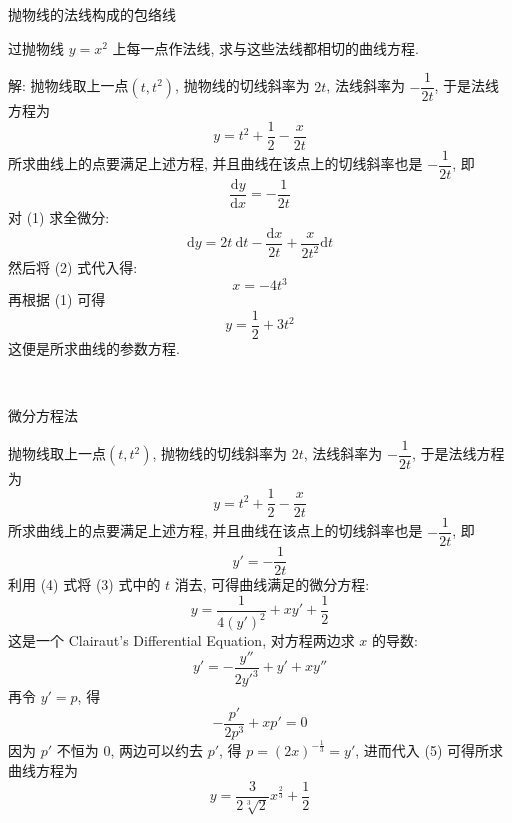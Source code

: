 \newpage

\noindent 抛物线的法线构成的包络线

过抛物线 $y = x^2$ 上每一点作法线, 求与这些法线都相切的曲线方程.
\begin{figure*}[htbp]
\centering
{}
\end{figure*}

解: 抛物线取上一点$(t,t^2)$, 抛物线的切线斜率为 $2t$, 法线斜率为 $-\dfrac{1}{2t}$, 于是法线方程为
\[ y = t^2 + \frac{1}{2} - \frac{x}{2t} \tag{1} \]
所求曲线上的点要满足上述方程, 并且曲线在该点上的切线斜率也是 $-\dfrac{1}{2t}$, 即
\[ \frac{\mathrm{d}y}{\mathrm{d}x} = -\frac{1}{2t} \tag{2} \]
对 (1) 求全微分:
\[ \mathrm{d}y = 2t\ \mathrm{d}t - \frac{\mathrm{d}x}{2t} + \frac{x}{2t^2}\mathrm{d}t \]
然后将 (2) 式代入得:
\[ x = -4t^3 \]
再根据 (1) 可得
\[ y = \frac{1}{2} + 3t^2 \]
这便是所求曲线的参数方程.

~

\noindent 微分方程法

抛物线取上一点$(t,t^2)$, 抛物线的切线斜率为 $2t$, 法线斜率为 $-\dfrac{1}{2t}$, 于是法线方程为
\[ y = t^2 + \frac{1}{2} - \frac{x}{2t} \tag{3} \]
所求曲线上的点要满足上述方程, 并且曲线在该点上的切线斜率也是 $-\dfrac{1}{2t}$, 即
\[ y' = -\frac{1}{2t} \tag{4} \]
利用 (4) 式将 (3) 式中的 $t$ 消去, 可得曲线满足的微分方程:
\[ y = \frac{1}{4(y')^2}+xy'+\frac{1}{2} \tag{5} \]
这是一个 Clairaut's Differential Equation, 对方程两边求 $x$ 的导数:
\[ y' = -\frac{y''}{2y'^3} + y' + xy''\]
再令 $y'=p$, 得
\[ -\frac{p'}{2p^3}+xp' = 0 \]
因为 $p'$ 不恒为 $0$, 两边可以约去 $p'$, 得 $p = (2x)^{-\frac{1}{3}} = y'$, 进而代入 (5) 可得所求曲线方程为
\[ y = \frac{3}{2\sqrt[3]{2}}x^{\frac{2}{3}} +  \frac{1}{2} \]


